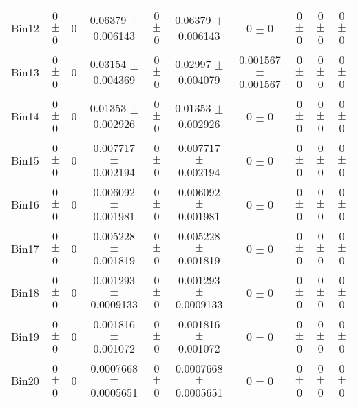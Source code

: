 \begin{tabular}{@{\extracolsep{4pt}}lccccccccc@{}}
     Bin12 & 0 $\pm$ 0 & 0 & 0.06379 $\pm$ 0.006143 & 0 $\pm$ 0 & 0.06379 $\pm$ 0.006143 & 0 $\pm$ 0 & 0 $\pm$ 0 & 0 $\pm$ 0 & 0 $\pm$ 0 \\ 
     Bin13 & 0 $\pm$ 0 & 0 & 0.03154 $\pm$ 0.004369 & 0 $\pm$ 0 & 0.02997 $\pm$ 0.004079 & 0.001567 $\pm$ 0.001567 & 0 $\pm$ 0 & 0 $\pm$ 0 & 0 $\pm$ 0 \\ 
     Bin14 & 0 $\pm$ 0 & 0 & 0.01353 $\pm$ 0.002926 & 0 $\pm$ 0 & 0.01353 $\pm$ 0.002926 & 0 $\pm$ 0 & 0 $\pm$ 0 & 0 $\pm$ 0 & 0 $\pm$ 0 \\ 
     Bin15 & 0 $\pm$ 0 & 0 & 0.007717 $\pm$ 0.002194 & 0 $\pm$ 0 & 0.007717 $\pm$ 0.002194 & 0 $\pm$ 0 & 0 $\pm$ 0 & 0 $\pm$ 0 & 0 $\pm$ 0 \\ 
     Bin16 & 0 $\pm$ 0 & 0 & 0.006092 $\pm$ 0.001981 & 0 $\pm$ 0 & 0.006092 $\pm$ 0.001981 & 0 $\pm$ 0 & 0 $\pm$ 0 & 0 $\pm$ 0 & 0 $\pm$ 0 \\ 
     Bin17 & 0 $\pm$ 0 & 0 & 0.005228 $\pm$ 0.001819 & 0 $\pm$ 0 & 0.005228 $\pm$ 0.001819 & 0 $\pm$ 0 & 0 $\pm$ 0 & 0 $\pm$ 0 & 0 $\pm$ 0 \\ 
     Bin18 & 0 $\pm$ 0 & 0 & 0.001293 $\pm$ 0.0009133 & 0 $\pm$ 0 & 0.001293 $\pm$ 0.0009133 & 0 $\pm$ 0 & 0 $\pm$ 0 & 0 $\pm$ 0 & 0 $\pm$ 0 \\ 
     Bin19 & 0 $\pm$ 0 & 0 & 0.001816 $\pm$ 0.001072 & 0 $\pm$ 0 & 0.001816 $\pm$ 0.001072 & 0 $\pm$ 0 & 0 $\pm$ 0 & 0 $\pm$ 0 & 0 $\pm$ 0 \\ 
     Bin20 & 0 $\pm$ 0 & 0 & 0.0007668 $\pm$ 0.0005651 & 0 $\pm$ 0 & 0.0007668 $\pm$ 0.0005651 & 0 $\pm$ 0 & 0 $\pm$ 0 & 0 $\pm$ 0 & 0 $\pm$ 0 \\ 
\hline\hline
  \end{tabular}
